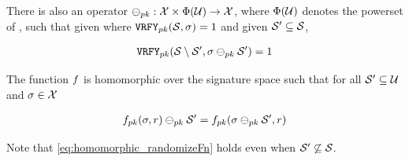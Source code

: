 \begin{definition}
	There is also an operator $\sigMinus[\pubKey]: \sigOutputSpace
	\times \powerset(\universe) \rightarrow
	\sigOutputSpace$, where $\Phi(\mathcal{U})$ denotes the powerset
          of \universe, such that given \genericSig where
	$\verify[\pubKey](\genericSetVar, \genericSig) = 1$ and given
	$\genericSetVarAlt \subseteq \genericSetVar$,
	
	
	
	\begin{align}
		\verify[\pubKey](\genericSetVar \setminus \genericSetVarAlt,
		\genericSig \sigMinus[\pubKey] \genericSetVarAlt) = 1 
		\label{eq:sig_homomorphism_minus} 
			\end{align}
	

	The function $\randomizeFn$ is homomorphic over the signature space such that for all $\genericSetVar' \subseteq \universe$ and $\genericSig \in \sigOutputSpace$

	\begin{align}
	\randomizeFn[\pubKey](\genericSig, \genericRand) \sigMinus[\pubKey] \genericSetVarAlt = 
		\randomizeFn[\pubKey](\genericSig \sigMinus[\pubKey] \genericSetVarAlt, 
		\genericRand) 
		\label{eq:homomorphic_randomizeFn}
	\end{align}

	Note that \eqref{eq:homomorphic_randomizeFn} holds even when $\genericSetVarAlt \not\subseteq \genericSetVar$. 

	
	
\end{definition}

%

